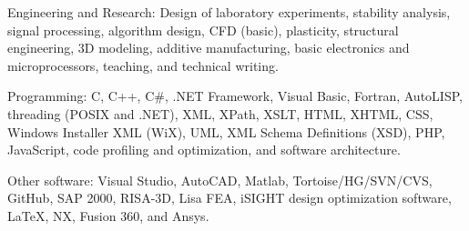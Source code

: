 \documentclass{resume}
\begin{document}
    \begin{bulletedlist}
		
        \item Engineering and Research: Design of laboratory experiments,
                        stability analysis,
                        signal processing,
                        algorithm design,
                        CFD (basic),
                        plasticity,
                        structural engineering,
                        3D modeling,
                        additive manufacturing,
                        basic electronics and microprocessors,
                        teaching,
                        and technical writing.
                        
        \item Programming: C,
                        C++,
                        C\#,
                        .NET Framework,
                        Visual Basic,
                        Fortran,
                        AutoLISP,
                        threading (POSIX and .NET),
                        XML,
                        XPath,
                        XSLT,
                        HTML,
                        XHTML,
                        CSS,
                        Windows Installer XML (WiX),
                        UML,
                        XML Schema Definitions (XSD),
                        PHP,
                        JavaScript,
                        code profiling and optimization,
                        and software architecture.
                        
        \item Other software: Visual Studio,
                        AutoCAD,
                        Matlab,
                        Tortoise/HG/SVN/CVS,
                        GitHub,
                        SAP 2000,
                        RISA-3D,
                        Lisa FEA,
                        iSIGHT design optimization software,
                        LaTeX,
                        NX,
                        Fusion 360,
                        and Ansys.
                        
	\end{bulletedlist}
	

    
\end{document}
